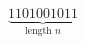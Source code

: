 \documentclass[preview]{standalone}
\begin{document}
\begin{align*}
\underbrace{1101001011}_{\text{length } n}
\end{align*}
\end{document}
